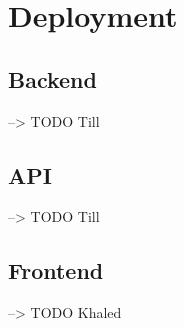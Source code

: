
\chapter{Deployment}
\section{Backend}
--> TODO Till
\section{API}
--> TODO Till
\section{Frontend}
--> TODO Khaled

